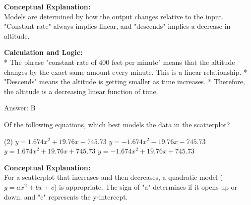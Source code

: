 \documentclass[11pt,paper=a4,answers]{exam}
\begin{document}
\begin{questions}
\begin{solution}
\textbf{Conceptual Explanation:} \\
Models are determined by how the output changes relative to the input. "Constant rate" always implies linear, and "descends" implies a decrease in altitude.

\vspace{30pt}

\textbf{Calculation and Logic:} \\
* The phrase "constant rate of 400 feet per minute" means that the altitude changes by the exact same amount every minute. This is a linear relationship.
* "Descends" means the altitude is getting smaller as time increases.
* Therefore, the altitude is a decreasing linear function of time.

\vspace{30pt}

Answer: \colorbox{yellow!100}{B}
\end{solution}

\vspace{60pt}

\question
\begin{center}
\end{center}
Of the following equations, which best models the data in the scatterplot?
\begin{tasks}(2)
    \task $y = 1.674x^2 + 19.76x - 745.73$
    \task $y = -1.674x^2 - 19.76x - 745.73$
    \task $y = 1.674x^2 + 19.76x + 745.73$
    \task $y = -1.674x^2 + 19.76x + 745.73$
\end{tasks}

\begin{solution}
\textbf{Conceptual Explanation:} \\
For a scatterplot that increases and then decreases, a quadratic model ($y = ax^2 + bx + c$) is appropriate. The sign of "a" determines if it opens up or down, and "c" represents the y-intercept.


\end{solution}
\end{questions}
\end{document}
